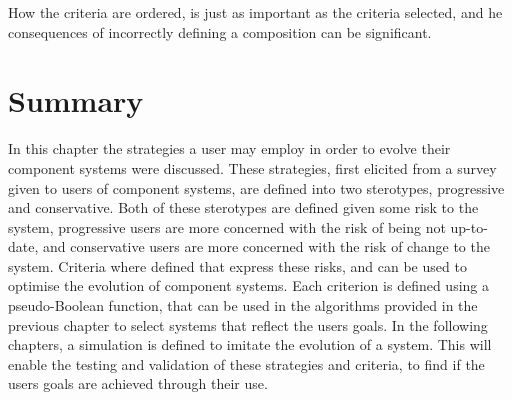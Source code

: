 How the criteria are ordered, is just as important as the criteria selected, and he consequences of incorrectly defining a composition can be significant.

\section{Summary}
In this chapter the strategies a user may employ in order to evolve their component systems were discussed.
These strategies, first elicited from a survey given to users of component systems, are defined into two sterotypes, progressive and conservative.
Both of these sterotypes are defined given some risk to the system, progressive users are more concerned with the risk of being not up-to-date,
and conservative users are more concerned with the risk of change to the system.
Criteria where defined that express these risks, and can be used to optimise the evolution of component systems.
Each criterion is defined using a pseudo-Boolean function, that can be used in the algorithms provided in the previous chapter to select systems that reflect the users goals.
In the following chapters, a simulation is defined to imitate the evolution of a system.
This will enable the testing and validation of these strategies and criteria, to find if the users goals are achieved through their use. 

